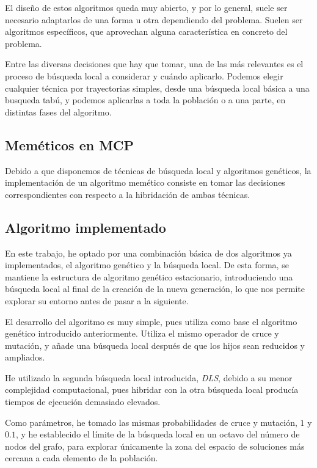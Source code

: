 El diseño de estos algoritmos queda muy abierto, y por lo general, suele ser necesario
adaptarlos de una forma u otra dependiendo del problema. Suelen ser algoritmos específicos,
que aprovechan alguna característica en concreto del problema.

Entre las diversas decisiones que hay que tomar, una de las más relevantes es el
proceso de búsqueda local a considerar y cuándo aplicarlo. Podemos elegir cualquier
técnica por trayectorias simples, desde una búsqueda local básica a una busqueda
tabú, y podemos aplicarlas a toda la población o a una parte, en distintas
fases del algoritmo.

\subsection{Meméticos en MCP}

Debido a que disponemos de técnicas de búsqueda local y algoritmos genéticos, la
implementación de un algoritmo memético consiste en tomar las decisiones correspondientes
con respecto a la hibridación de ambas técnicas.

\subsection{Algoritmo implementado}

En este trabajo, he optado por una combinación básica de dos algoritmos ya implementados,
el algoritmo genético y la búsqueda local. De esta forma, se mantiene la estructura
de algoritmo genético estacionario, introduciendo una búsqueda local al final de
la creación de la nueva generación, lo que nos permite explorar su entorno antes de
pasar a la siguiente.

El desarrollo del algoritmo es muy simple, pues utiliza como base el algoritmo
genético introducido anteriormente. Utiliza el mismo operador de cruce y mutación,
y añade una búsqueda local después de que los hijos sean reducidos y ampliados.

He utilizado la segunda búsqueda local introducida, \textit{DLS}, debido a su menor
complejidad computacional, pues hibridar con la otra búsqueda local producía tiempos
de ejecución demasiado elevados.

Como parámetros, he tomado las mismas probabilidades de cruce y mutación, $1$ y $0.1$,
y he establecido el límite de la búsqueda local en un octavo del número de nodos
del grafo, para explorar únicamente la zona del espacio de soluciones más cercana
a cada elemento de la población.
